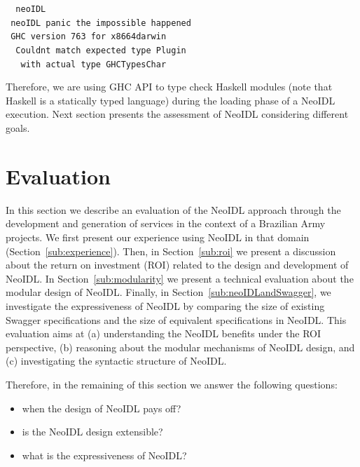 \documentclass{ws-ijseke}
\newcommand{\neoidl}{NeoIDL}
\begin{document}
\begin{tabbing}\tt
~neoIDL\\
\tt ~neoIDL~panic~the~impossible~happened\\
\tt ~GHC~version~763~for~x8664darwin\\
\tt ~~Couldnt~match~expected~type~Plugin\\
\tt ~~~with~actual~type~GHCTypesChar
\end{tabbing}

Therefore, we are using GHC API to type check Haskell modules (note that Haskell is a statically typed language) during
the loading phase of a \neoidl{} execution. Next section presents the assessment of \neoidl{} considering different 
goals. 


  

\section{Evaluation}\label{sec:assessment}

In this section we describe an evaluation of the
\neoidl{} approach through the development and generation 
of services in the context of a Brazilian
Army projects.
We first present our experience using 
\neoidl{} in that domain (Section~\ref{sub:experience}). Then, in
Section~\ref{sub:roi} we present a discussion about the 
return on investment (ROI) related to the design and development of
\neoidl. In Section~\ref{sub:modularity} we present a
technical evaluation about the modular design of \neoidl{}. Finally, in Section~\ref{sub:neoIDLandSwagger}, 
we investigate the expressiveness of \neoidl{} by comparing the size 
of existing Swagger specifications and the size of equivalent specifications 
in \neoidl.  This evaluation aims at (a) understanding the \neoidl{} benefits under the ROI 
perspective, (b) reasoning about the modular mechanisms of \neoidl{}
design, and (c) investigating the syntactic structure of \neoidl. 

Therefore, in the remaining of this section we answer the following questions:

\begin{itemize}
 \item when the design of \neoidl{} pays off?
 \item is the \neoidl{} design extensible? 
 \item what is the expressiveness of \neoidl?
\end{itemize}
\end{document}
